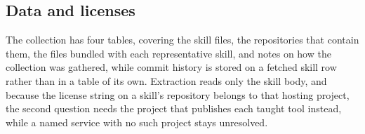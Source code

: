 \subsection{Data and licenses}

The collection has four tables, covering the skill files, the repositories that contain them, the files bundled with each representative skill, and notes on how the collection was gathered, while commit history is stored on a fetched skill row rather than in a table of its own.
Extraction reads only the skill body, and because the license string on a skill's repository belongs to that hosting project, the second question needs the project that publishes each taught tool instead, while a named service with no such project stays unresolved.
